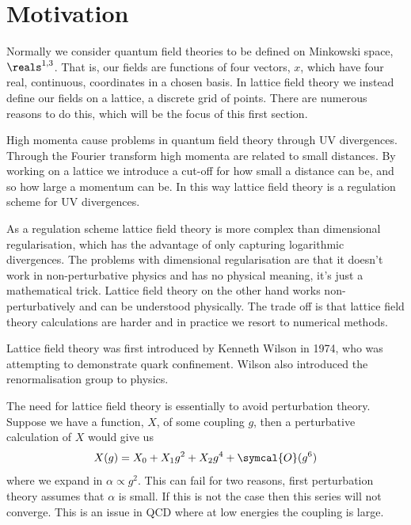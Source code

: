 \documentclass[fleqn]{NotesClass}
\newcommand{\order}{\symcal{O}}
\newcommand{\minkowskiSpace}{\reals^{1,3}}
\begin{document}
    \section{Motivation}
    Normally we consider quantum field theories to be defined on Minkowski space, \(\minkowskiSpace\).
    That is, our fields are functions of four vectors, \(x\), which have four real, continuous, coordinates in a chosen basis.
    In lattice field theory we instead define our fields on a lattice, a discrete grid of points.
    There are numerous reasons to do this, which will be the focus of this first section.
    
    High momenta cause problems in quantum field theory through UV divergences.
    Through the Fourier transform high momenta are related to small distances.
    By working on a lattice we introduce a cut-off for how small a distance can be, and so how large a momentum can be.
    In this way lattice field theory is a regulation scheme for UV divergences.
    
    As a regulation scheme lattice field theory is more complex than dimensional regularisation, which has the advantage of only capturing logarithmic divergences.
    The problems with dimensional regularisation are that it doesn't work in non-perturbative physics and has no physical meaning, it's just a mathematical trick.
    Lattice field theory on the other hand works non-perturbatively and can be understood physically.
    The trade off is that lattice field theory calculations are harder and in practice we resort to numerical methods.
    
    Lattice field theory was first introduced by Kenneth Wilson in 1974, who was attempting to demonstrate quark confinement.
    Wilson also introduced the renormalisation group to physics.
    
    The need for lattice field theory is essentially to avoid perturbation theory.
    Suppose we have a function, \(X\), of some coupling \(g\), then a perturbative calculation of \(X\) would give us
    \begin{equation}
        X(g) = X_0 + X_1 g^2 + X_2 g^4 + \order(g^6)
    \end{equation}
    where we expand in \(\alpha \propto g^2\).
    This can fail for two reasons, first perturbation theory assumes that \(\alpha\) is small.
    If this is not the case then this series will not converge.
    This is an issue in QCD where at low energies the coupling is large.
    
\end{document}
